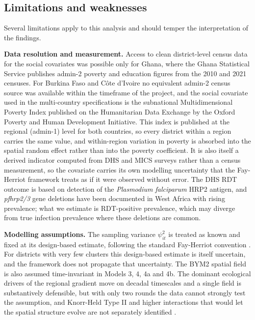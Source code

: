 \documentclass{article}
\begin{document}
\subsection{Limitations and weaknesses}\label{sec:limitations}

Several limitations apply to this analysis and should temper the
interpretation of the findings.

\textbf{Data resolution and measurement.} Access to clean district-level
census data for the social covariates was possible only for Ghana, where
the Ghana Statistical Service publishes admin-2 poverty and education
figures from the 2010 and 2021 censuses. For Burkina Faso and Côte
d'Ivoire no equivalent admin-2 census source was available within the
timeframe of the project, and the social covariate used in the
multi-country specifications is the subnational Multidimensional Poverty
Index published on the Humanitarian Data Exchange by the Oxford Poverty
and Human Development Initiative. This index is published at the
regional (admin-1) level for both countries, so every district within a
region carries the same value, and within-region variation in poverty is
absorbed into the spatial random effect rather than into the poverty
coefficient. It is also itself a derived indicator computed from DHS and
MICS surveys rather than a census measurement, so the covariate carries
its own modelling uncertainty that the Fay-Herriot framework treats as
if it were observed without error. The DHS RDT outcome is based on
detection of the \emph{Plasmodium falciparum} HRP2 antigen, and
\emph{pfhrp2/3} gene deletions have been documented in West Africa with
rising prevalence; what we estimate is RDT-positive prevalence, which
may diverge from true infection prevalence where these deletions are
common.

\textbf{Modelling assumptions.} The sampling variance \(\psi_{it}^2\) is
treated as known and fixed at its design-based estimate, following the
standard Fay-Herriot convention \citep{fay1979, you2002}. For districts
with very few clusters this design-based estimate is itself uncertain,
and the framework does not propagate that uncertainty. The BYM2 spatial
field is also assumed time-invariant in Models 3, 4, 4a and 4b. The
dominant ecological drivers of the regional gradient move on decadal
timescales and a single field is substantively defensible, but with only
two rounds the data cannot strongly test the assumption, and Knorr-Held
Type II and higher interactions that would let the spatial structure
evolve are not separately identified \citep{knorrheld2000, goicoa2018}.
\end{document}
